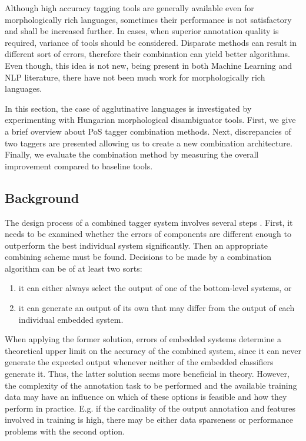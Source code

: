 Although high accuracy tagging tools are generally available even for morphologically rich languages, sometimes their performance is not satisfactory and shall be increased further.
In cases, when superior annotation quality is required, variance of tools should be considered.
Disparate methods can result in different sort of errors, therefore their combination can yield better algorithms.
Even though, this idea is not new, being present in both Machine Learning and NLP literature, there have not been much work for morphologically rich languages. 

In this section, the case of agglutinative languages is investigated by experimenting with Hungarian morphological disambiguator tools.
First, we give a brief overview about PoS tagger combination methods.
Next, discrepancies of two taggers are presented allowing us to create a new combination architecture.
Finally, we evaluate the combination method by measuring the overall improvement compared to baseline tools.

\subsection{Background}

The design process of a combined tagger system involves several steps \cite{Brill1998,Halteren2001}.
First, it needs to be examined whether the errors of components are different enough to outperform the best individual system significantly.
Then an appropriate combining scheme must be found.
Decisions to be made by a combination algorithm can be of at least two sorts: 
\begin{enumerate}
  \item it can either always select the output of one of the bottom-level systems, or 
  \item it can generate an output of its own that may differ from the output of each individual embedded system. 
\end{enumerate}

When applying the former solution, errors of embedded systems determine a theoretical upper limit on the accuracy of the combined system, since it can never generate the expected output whenever neither of the embedded classifiers generate it.
Thus, the latter solution seems more beneficial in theory.
However, the complexity of the annotation task to be performed and the available training data may have an influence on which of these options is feasible and how they perform in practice.
E.g. if the cardinality of the output annotation and features involved in training is high, there may be either data sparseness or performance problems with the second option.

